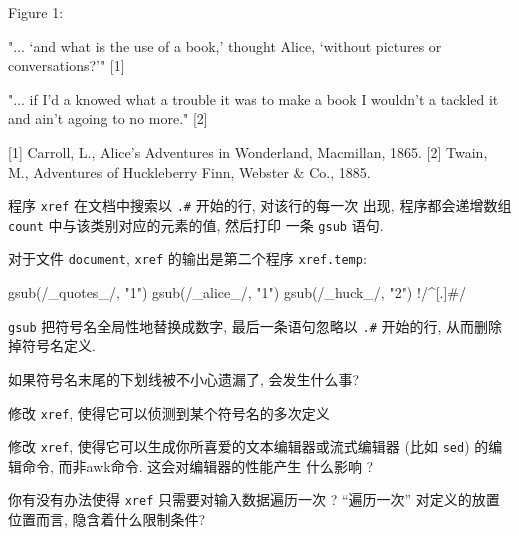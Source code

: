 {\begin{file}
                            Figure 1:

      "... `and what is the use of a book,' thought Alice,
      `without pictures or conversations?'" [1]

      "... if I'd a knowed what a trouble it was to make a book
      I wouldn't a tackled it and ain't agoing to no more." [2]


    [1] Carroll, L., Alice's Adventures in Wonderland,
        Macmillan, 1865.
    [2] Twain, M., Adventures of Huckleberry Finn,
        Webster & Co., 1885.
\end{file}

程序 \texttt{xref} 在文档中搜索以 \texttt{.\#} 开始的行, 对该行的每一次
出现, 程序都会递增数组 \texttt{count} 中与该类别对应的元素的值, 然后打印
一条 \texttt{gsub} 语句.
对于文件 \texttt{document}, \texttt{xref} 的输出是第二个程序
\texttt{xref.temp}:
\begin{awkcode}
    { gsub(/_quotes_/, "1") }
    { gsub(/_alice_/, "1") }
    { gsub(/_huck_/, "2") }
    !/^[.]#/
\end{awkcode}
\texttt{gsub} 把符号名全局性地替换成数字, 最后一条语句忽略以 \texttt{.\#}
开始的行, 从而删除掉符号名定义.

\begin{exercise}
    如果符号名末尾的下划线被不小心遗漏了, 会发生什么事?
\end{exercise}

\begin{exercise}
    修改 \texttt{xref}, 使得它可以侦测到某个符号名的多次定义
\end{exercise}

\begin{exercise}
    修改 \texttt{xref}, 使得它可以生成你所喜爱的文本编辑器或流式编辑器
    (比如 \texttt{sed}) 的编辑命令, 而非awk命令. 这会对编辑器的性能产生
    什么影响 ?
\end{exercise}

\begin{exercise}
    你有没有办法使得 \texttt{xref} 只需要对输入数据遍历一次 ? ``遍历一次''
    对定义的放置位置而言, 隐含着什么限制条件?
\end{exercise}

}
